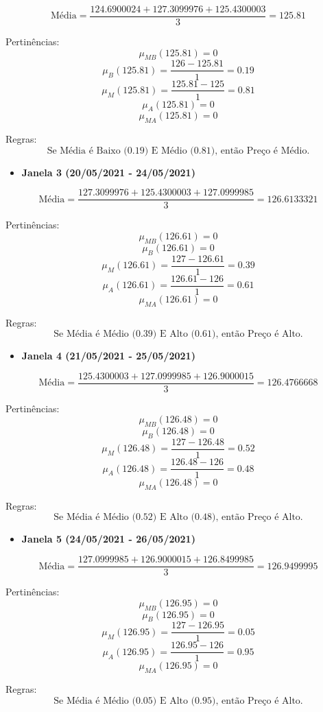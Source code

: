 \documentclass[a4paper, 12pt]{article}
\begin{document}
\[
\text{Média} = \frac{124.6900024 + 127.3099976 + 125.4300003}{3} = 125.81
\]

Pertinências:
\[
\mu_{MB}(125.81) = 0
\]
\[
\mu_{B}(125.81) = \frac{126 - 125.81}{1} = 0.19
\]
\[
\mu_{M}(125.81) = \frac{125.81 - 125}{1} = 0.81
\]
\[
\mu_{A}(125.81) = 0
\]
\[
\mu_{MA}(125.81) = 0
\]

Regras:
\[
\text{Se Média é Baixo (0.19) E Médio (0.81), então Preço é Médio.}
\]

\begin{itemize}
    \item \textbf{Janela 3 (20/05/2021 - 24/05/2021)}
\end{itemize}

\[
\text{Média} = \frac{127.3099976 + 125.4300003 + 127.0999985}{3} = 126.6133321
\]

Pertinências:
\[
\mu_{MB}(126.61) = 0
\]
\[
\mu_{B}(126.61) = 0
\]
\[
\mu_{M}(126.61) = \frac{127 - 126.61}{1} = 0.39
\]
\[
\mu_{A}(126.61) = \frac{126.61 - 126}{1} = 0.61
\]
\[
\mu_{MA}(126.61) = 0
\]

Regras:
\[
\text{Se Média é Médio (0.39) E Alto (0.61), então Preço é Alto.}
\]

\begin{itemize}
    \item \textbf{Janela 4 (21/05/2021 - 25/05/2021)}
\end{itemize}

\[
\text{Média} = \frac{125.4300003 + 127.0999985 + 126.9000015}{3} = 126.4766668
\]

Pertinências:
\[
\mu_{MB}(126.48) = 0
\]
\[
\mu_{B}(126.48) = 0
\]
\[
\mu_{M}(126.48) = \frac{127 - 126.48}{1} = 0.52
\]
\[
\mu_{A}(126.48) = \frac{126.48 - 126}{1} = 0.48
\]
\[
\mu_{MA}(126.48) = 0
\]

Regras:
\[
\text{Se Média é Médio (0.52) E Alto (0.48), então Preço é Alto.}
\]

\begin{itemize}
    \item \textbf{Janela 5 (24/05/2021 - 26/05/2021)}
\end{itemize}

\[
\text{Média} = \frac{127.0999985 + 126.9000015 + 126.8499985}{3} = 126.9499995
\]

Pertinências:
\[
\mu_{MB}(126.95) = 0
\]
\[
\mu_{B}(126.95) = 0
\]
\[
\mu_{M}(126.95) = \frac{127 - 126.95}{1} = 0.05
\]
\[
\mu_{A}(126.95) = \frac{126.95 - 126}{1} = 0.95
\]
\[
\mu_{MA}(126.95) = 0
\]

Regras:
\[
\text{Se Média é Médio (0.05) E Alto (0.95), então Preço é Alto.}
\]
\end{document}
